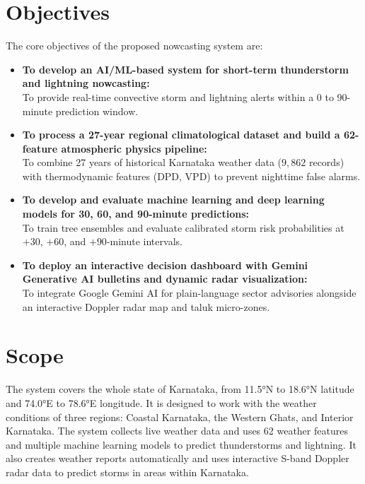 \documentclass[12pt,a4paper]{report}
\begin{document}
\section{Objectives}
The core objectives of the proposed nowcasting system are:
\begin{itemize}[leftmargin=1.2em, itemsep=3pt, topsep=2pt]
    \item \textbf{To develop an AI/ML-based system for short-term thunderstorm and lightning nowcasting:} \\
    To provide real-time convective storm and lightning alerts within a $0$ to $90$-minute prediction window.

    \item \textbf{To process a 27-year regional climatological dataset and build a 62-feature atmospheric physics pipeline:} \\
    To combine 27 years of historical Karnataka weather data ($9,862$ records) with thermodynamic features (DPD, VPD) to prevent nighttime false alarms.

    \item \textbf{To develop and evaluate machine learning and deep learning models for 30, 60, and 90-minute predictions:} \\
    To train tree ensembles and evaluate calibrated storm risk probabilities at $+30$, $+60$, and $+90$-minute intervals.

    \item \textbf{To deploy an interactive decision dashboard with Gemini Generative AI bulletins and dynamic radar visualization:} \\
    To integrate Google Gemini AI for plain-language sector advisories alongside an interactive Doppler radar map and taluk micro-zones.
\end{itemize}

\section{Scope}
The system covers the whole state of Karnataka, from 11.5°N to 18.6°N latitude and 74.0°E to 78.6°E longitude. It is designed to work with the weather conditions of three regions: Coastal Karnataka, the Western Ghats, and Interior Karnataka. The system collects live weather data and uses 62 weather features and multiple machine learning models to predict thunderstorms and lightning. It also creates weather reports automatically and uses interactive S-band Doppler radar data to predict storms in areas within Karnataka.
\end{document}
